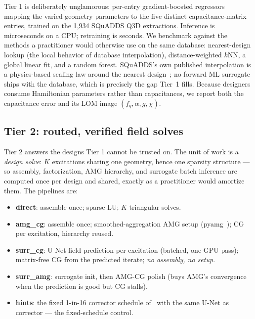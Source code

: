 \documentclass[11pt]{article}
\begin{document}
Tier 1 is deliberately unglamorous: per-entry gradient-boosted regressors
mapping the varied geometry parameters to the five distinct capacitance-matrix
entries, trained on the 1{,}934 SQuADDS Q3D extractions. Inference is
microseconds on a CPU; retraining is seconds. We benchmark against the methods
a practitioner would otherwise use on the same database: nearest-design lookup
(the local behavior of database interpolation), distance-weighted $k$NN, a
global linear fit, and a random forest. SQuADDS's own published interpolation
is a physics-based scaling law around the nearest design~\cite{squadds}; no
forward ML surrogate ships with the database, which is precisely the gap
Tier~1 fills. Because designers consume Hamiltonian parameters rather than
capacitances, we report both the capacitance error and its LOM image
$(f_q,\alpha,g,\chi)$.

\subsection{Tier 2: routed, verified field solves}

Tier 2 answers the designs Tier 1 cannot be trusted on. The unit of work is a
\emph{design solve}: $K$ excitations sharing one geometry, hence one sparsity
structure --- so assembly, factorization, AMG hierarchy, and surrogate batch
inference are computed once per design and shared, exactly as a practitioner
would amortize them. The pipelines are:

\begin{itemize}
  \item \textbf{direct}: assemble once; sparse LU; $K$ triangular solves.
  \item \textbf{amg\_cg}: assemble once; smoothed-aggregation AMG setup
        (pyamg~\cite{pyamg}); CG per excitation, hierarchy reused.
  \item \textbf{surr\_cg}: U-Net field prediction per excitation (batched, one
        GPU pass); matrix-free CG from the predicted iterate; \emph{no
        assembly, no setup}.
  \item \textbf{surr\_amg}: surrogate init, then AMG-CG polish (buys AMG's
        convergence when the prediction is good but CG stalls).
  \item \textbf{hints}: the fixed 1-in-16 corrector schedule of~\cite{hints}
        with the same U-Net as corrector --- the fixed-schedule control.
\end{itemize}
\end{document}
